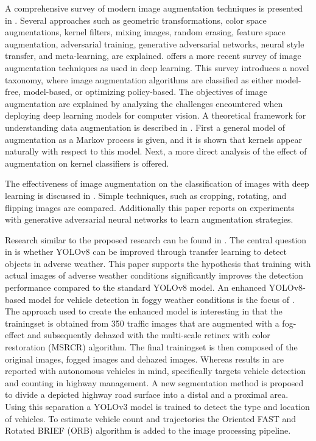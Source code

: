 \documentclass[]{article}
\begin{document}
	A comprehensive survey of modern image augmentation techniques is presented in \cite{shortenSurveyImageData2019}. Several approaches such as geometric transformations, color space augmentations, kernel filters, mixing images, random erasing, feature space augmentation, adversarial training, generative adversarial networks, neural style transfer, and meta-learning, are explained. \cite{xuComprehensiveSurveyImage2023} offers a more recent survey of image augmentation techniques as used in deep learning. This survey introduces a novel taxonomy, where image augmentation algorithms are classified as either model-free, model-based, or optimizing policy-based. The objectives of image augmentation are explained by analyzing the challenges encountered when deploying deep learning models for computer vision. A theoretical framework for understanding data augmentation is described in \cite{daoKernelTheoryModern2019}. First a general model of augmentation as a Markov process is given, and it is shown that kernels appear naturally with respect to this model. Next, a more direct analysis of the effect of augmentation on kernel classifiers is offered.
	
	The effectiveness of image augmentation on the classification of images with deep learning is discussed in \cite{perezEffectivenessDataAugmentation2017}. Simple techniques, such as cropping, rotating, and flipping images are compared. Additionally this paper reports on experiments with generative adversarial neural networks to learn augmentation strategies.
	
	Research similar to the proposed research can be found in \cite{kumarObjectDetectionAdverse2023}. The central question in \cite{kumarObjectDetectionAdverse2023} is whether YOLO{\small v8} can be improved through transfer learning to detect objects in adverse weather. This paper supports the hypothesis that training with actual images of adverse weather conditions significantly improves the detection performance compared to the standard YOLO{\small v8} model. An enhanced YOLO\small{v8}-based model for vehicle detection in foggy weather conditions is the focus of \cite{liVehicleDetectionFoggy2022}. The approach used to create the enhanced model is interesting in that the trainingset is obtained from 350 traffic images that are augmented with a fog-effect and subsequently dehazed with the multi-scale retinex with color restoration (MSRCR) algorithm. The final trainingset is then composed of the original images, fogged images and dehazed images. Whereas results in \cite{liVehicleDetectionFoggy2022} are reported with autonomous vehicles in mind, \cite{songVisionbasedVehicleDetection2019} specifically targets vehicle detection and counting in highway management.  A new segmentation method is proposed to divide a depicted highway road surface into a distal and a proximal area. Using this separation a YOLO{\small v3} model is trained to detect the type and location of vehicles. To estimate vehicle count and trajectories the Oriented FAST and Rotated BRIEF (ORB) algorithm is added to the image processing pipeline.
	
\end{document}
